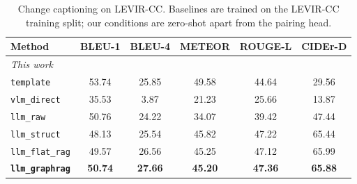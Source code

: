 \begin{table}[t]
\centering
\caption{Change captioning on LEVIR-CC. Baselines are trained on the LEVIR-CC training split; our conditions are zero-shot apart from the pairing head.}
\label{tab:levir_cc_caption}
\setlength{\tabcolsep}{3pt}
\begin{tabular}{lccccc}
\toprule
Method & BLEU-1 & BLEU-4 & METEOR & ROUGE-L & CIDEr-D \\
\midrule
\midrule
\multicolumn{6}{l}{\emph{This work}} \\
\texttt{template} & 53.74 & 25.85 & 49.58 & 44.64 & 29.56 \\
\texttt{vlm\_direct} & 35.53 & 3.87 & 21.23 & 25.66 & 13.87 \\
\texttt{llm\_raw} & 50.76 & 24.22 & 34.07 & 39.42 & 47.44 \\
\texttt{llm\_struct} & 48.13 & 25.54 & 45.82 & 47.22 & 65.44 \\
\texttt{llm\_flat\_rag} & 49.57 & 26.56 & 45.25 & 47.12 & 65.99 \\
\textbf{\texttt{llm\_graphrag}} & \textbf{50.74} & \textbf{27.66} & \textbf{45.20} & \textbf{47.36} & \textbf{65.88} \\
\bottomrule
\end{tabular}
\end{table}
